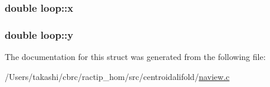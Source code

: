 \hypertarget{structloop_a83c555340d33764a979b7311888c6646}{
\subsubsection[{x}]{\setlength{\rightskip}{0pt plus 5cm}double loop\+::x}}\label{structloop_a83c555340d33764a979b7311888c6646}
\hypertarget{structloop_a46d7ddb88254dfc2ca248db8dd2a3680}{
\subsubsection[{y}]{\setlength{\rightskip}{0pt plus 5cm}double loop\+::y}}\label{structloop_a46d7ddb88254dfc2ca248db8dd2a3680}


The documentation for this struct was generated from the following file\+:\begin{DoxyCompactItemize}
\item 
/\+Users/takashi/cbrc/ractip\+\_\+hom/src/centroidalifold/\hyperlink{naview_8c}{naview.\+c}\end{DoxyCompactItemize}
